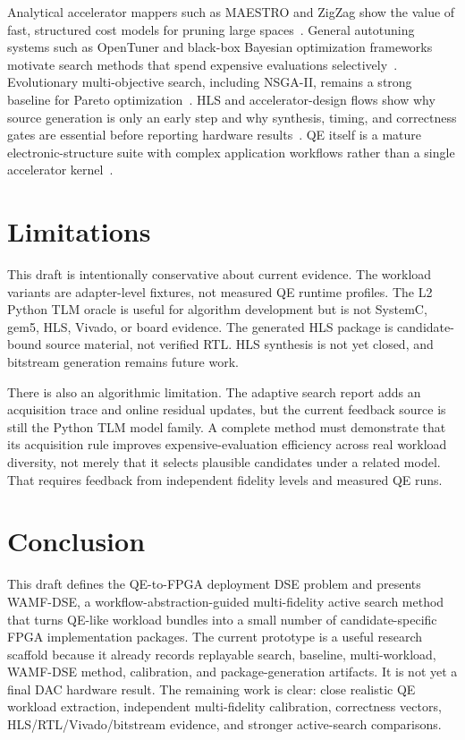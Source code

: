 \documentclass[sigconf,anonymous,review]{acmart}
\begin{document}
Analytical accelerator mappers such as MAESTRO and ZigZag show the value of fast, structured cost models for pruning large spaces~\cite{kwon2019maestro,mei2021zigzag}.  General autotuning systems such as OpenTuner and black-box Bayesian optimization frameworks motivate search methods that spend expensive evaluations selectively~\cite{wu2013opentuner,paria2019flexible}.  Evolutionary multi-objective search, including NSGA-II, remains a strong baseline for Pareto optimization~\cite{deb2002fast}.  HLS and accelerator-design flows show why source generation is only an early step and why synthesis, timing, and correctness gates are essential before reporting hardware results~\cite{pilato2013legup}.  QE itself is a mature electronic-structure suite with complex application workflows rather than a single accelerator kernel~\cite{giannozzi2009quantum,giannozzi2017advanced}.

\section{Limitations}

This draft is intentionally conservative about current evidence.  The workload variants are adapter-level fixtures, not measured QE runtime profiles.  The L2 Python TLM oracle is useful for algorithm development but is not SystemC, gem5, HLS, Vivado, or board evidence.  The generated HLS package is candidate-bound source material, not verified RTL.  HLS synthesis is not yet closed, and bitstream generation remains future work.

There is also an algorithmic limitation.  The adaptive search report adds an acquisition trace and online residual updates, but the current feedback source is still the Python TLM model family.  A complete method must demonstrate that its acquisition rule improves expensive-evaluation efficiency across real workload diversity, not merely that it selects plausible candidates under a related model.  That requires feedback from independent fidelity levels and measured QE runs.

\section{Conclusion}

This draft defines the QE-to-FPGA deployment DSE problem and presents WAMF-DSE, a workflow-abstraction-guided multi-fidelity active search method that turns QE-like workload bundles into a small number of candidate-specific FPGA implementation packages.  The current prototype is a useful research scaffold because it already records replayable search, baseline, multi-workload, WAMF-DSE method, calibration, and package-generation artifacts.  It is not yet a final DAC hardware result.  The remaining work is clear: close realistic QE workload extraction, independent multi-fidelity calibration, correctness vectors, HLS/RTL/Vivado/bitstream evidence, and stronger active-search comparisons.



\end{document}
